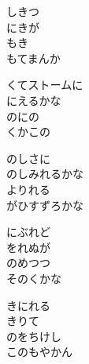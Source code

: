 \documentclass[10pt,b5j]{tarticle} %
\begin{document}
\vspace{1.5em} %
\newcommand{\linespace}{0.5em} %
\newcommand{\blocksize}{0.5\hsize} %
\begin{enumerate} %
    \begin{minipage}[c]{\blocksize}
    
        \vspace{\linespace}
        \item
        しきつ\\
        にきが\\
        もき\\
        もてまんか
        
        \vspace{\linespace}
        \item
        くてストームに\\
        にえるかな\\
        のにの\\
        くかこの
        
        \vspace{\linespace}
        \item
        のしさに\\
        のしみれるかな\\
        よりれる\\
        がひすずろかな
        
        \vspace{\linespace}
        \item
        にぶれど\\
        をれぬが\\
        のめつつ\\
        そのくかな
        
        \vspace{\linespace}
        \item
        きにれる\\
        きりて\\
        のをちけし\\
        このもやかん
        

\end{minipage}
\end{enumerate}
\end{document}
